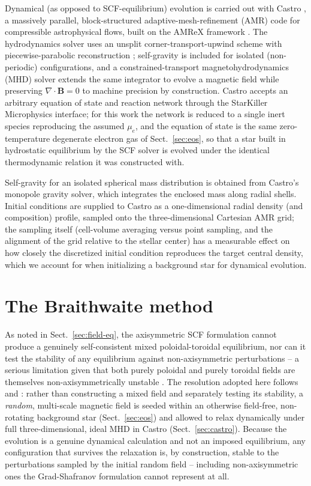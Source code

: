 \documentclass{aa}
\begin{document}
Dynamical (as opposed to SCF-equilibrium) evolution is carried out with
Castro \citep{castro}, a massively parallel, block-structured
adaptive-mesh-refinement (AMR) code for compressible astrophysical
flows, built on the AMReX framework \citep{AMReX}. The hydrodynamics
solver uses an unsplit corner-transport-upwind scheme \citep{ctu} with
piecewise-parabolic reconstruction \citep{ppm}; self-gravity is
included for isolated (non-periodic) configurations, and a
constrained-transport magnetohydrodynamics (MHD) solver extends the
same integrator to evolve a magnetic field while preserving
$\nabla\!\cdot\!\mathbf{B}=0$ to machine precision by construction.
Castro accepts an arbitrary equation of state and reaction network
through the StarKiller Microphysics interface; for this work the
network is reduced to a single inert species reproducing the assumed
$\mu_e$, and the equation of state is the same zero-temperature
degenerate electron gas of Sect.~\ref{sec:eos}, so that a star built in
hydrostatic equilibrium by the SCF solver is evolved under the
identical thermodynamic relation it was constructed with.

Self-gravity for an isolated spherical mass distribution is obtained
from Castro's monopole gravity solver, which integrates the enclosed
mass along radial shells. Initial conditions are supplied to Castro as
a one-dimensional radial density (and composition) profile, sampled
onto the three-dimensional Cartesian AMR grid; the sampling itself
(cell-volume averaging versus point sampling, and the alignment of the
grid relative to the stellar center) has a measurable effect on how
closely the discretized initial condition reproduces the target central
density, which we account for when initializing a background star for
dynamical evolution.


\section{The Braithwaite method}
\label{sec:braithwaite}

As noted in Sect.~\ref{sec:field-eq}, the axisymmetric SCF formulation
cannot produce a genuinely self-consistent mixed poloidal-toroidal
equilibrium, nor can it test the stability of any equilibrium against
non-axisymmetric perturbations -- a serious limitation given that both
purely poloidal and purely toroidal fields are themselves
non-axisymmetrically unstable \citep{tayler1973,markey1973}. The
resolution adopted here follows \citet{braithwaite2004} and
\citet{braithwaite2006}: rather than constructing a mixed field and
separately testing its stability, a \emph{random}, multi-scale magnetic
field is seeded within an otherwise field-free, non-rotating background
star (Sect.~\ref{sec:eos}) and allowed to relax dynamically under full
three-dimensional, ideal MHD in Castro (Sect.~\ref{sec:castro}). Because
the evolution is a genuine dynamical calculation and not an imposed
equilibrium, any configuration that survives the relaxation is, by
construction, stable to the perturbations sampled by the initial random
field -- including non-axisymmetric ones the Grad-Shafranov formulation
cannot represent at all.
\end{document}
